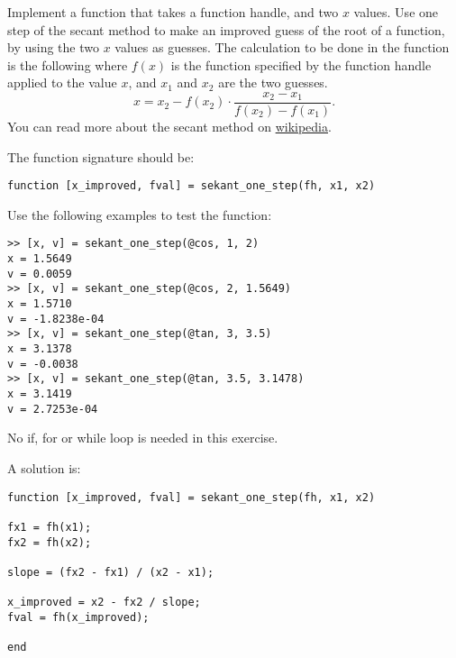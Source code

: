 \begin{ex}
\label{exSecantMethodOneStep}%
Implement a function that takes a function handle, and two 
$x$ values.
Use one step of the secant method to make an improved guess of the
root of a function, by using the two $x$ values as guesses.
The calculation to be done in the function is the following
where $f(x)$ is the function specified by the function handle
applied to the value $x$, and $x_1$ and $x_2$ are the two
guesses.
\[
x=x_{2}-f(x_{2}) \cdot {\frac {x_{2}-x_{1}}{f(x_{2})-f(x_{1})}}.
\]
You can read more about the secant method on \href{https://en.wikipedia.org/wiki/Secant_method}{wikipedia}.

The function signature should be:
\begin{lstlisting}
function [x_improved, fval] = sekant_one_step(fh, x1, x2)
\end{lstlisting}
Use the following examples to test the function:
\begin{lstlisting}
>> [x, v] = sekant_one_step(@cos, 1, 2)
x = 1.5649
v = 0.0059
>> [x, v] = sekant_one_step(@cos, 2, 1.5649)
x = 1.5710
v = -1.8238e-04
>> [x, v] = sekant_one_step(@tan, 3, 3.5)
x = 3.1378
v = -0.0038
>> [x, v] = sekant_one_step(@tan, 3.5, 3.1478)
x = 3.1419
v = 2.7253e-04
\end{lstlisting}
\begin{hint}
No if, for or while loop is needed in this exercise.
\end{hint}
\begin{sol}
A solution is:
\begin{lstlisting}
function [x_improved, fval] = sekant_one_step(fh, x1, x2)

fx1 = fh(x1);
fx2 = fh(x2);

slope = (fx2 - fx1) / (x2 - x1);

x_improved = x2 - fx2 / slope;
fval = fh(x_improved);

end
\end{lstlisting}
\end{sol}
\end{ex}


